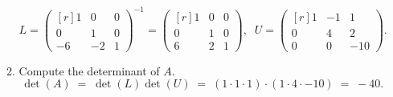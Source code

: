 \documentclass[11pt]{article}
\begin{document}
\begin{enumerate}
\begin{enumerate}
		            \[
			            L =
			            \begin{pmatrix*}[r]
				            1  & 0  & 0 \\
				            0  & 1  & 0 \\
				            -6 & -2 & 1
			            \end{pmatrix*}^{-1}
			            =
			            \begin{pmatrix*}[r]
				            1 & 0 & 0 \\
				            0 & 1 & 0 \\
				            6 & 2 & 1
			            \end{pmatrix*}, \;\;
			            U =
			            \begin{pmatrix*}[r]
				            1 & -1 & 1   \\
				            0 & 4  & 2   \\
				            0 & 0  & -10
			            \end{pmatrix*}.
		            \]

		      \item Compute the determinant of \(A\).
		            \[\det(A) \;=\; \det(L)\det(U) \;=\; (1 \cdot 1 \cdot 1) \cdot (1 \cdot 4 \cdot -10) \;=\; -40.\]


\end{enumerate}
\end{enumerate}
\end{document}
